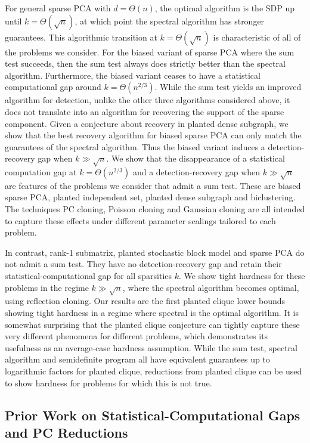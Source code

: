 \documentclass[11pt]{article}
\begin{document}
For general sparse PCA with $d = \Theta(n)$, the optimal algorithm is the SDP up until $k = \Theta(\sqrt{n})$, at which point the spectral algorithm has stronger guarantees. This algorithmic transition at $k = \Theta(\sqrt{n})$ is characteristic of all of the problems we consider. For the biased variant of sparse PCA where the sum test succeeds, then the sum test always does strictly better than the spectral algorithm. Furthermore, the biased variant ceases to have a statistical computational gap around $k = \Theta(n^{2/3})$. While the sum test yields an improved algorithm for detection, unlike the other three algorithms considered above, it does not translate into an algorithm for recovering the support of the sparse component. Given a conjecture about recovery in planted dense subgraph, we show that the best recovery algorithm for biased sparse PCA can only match the guarantees of the spectral algorithm. Thus the biased variant induces a detection-recovery gap when $k \gg \sqrt{n}$. We show that the disappearance of a statistical computation gap at $k = \Theta(n^{2/3})$ and a detection-recovery gap when $k \gg \sqrt{n}$ are features of the problems we consider that admit a sum test. These are biased sparse PCA, planted independent set, planted dense subgraph and biclustering. The techniques PC cloning, Poisson cloning and Gaussian cloning are all intended to capture these effects under different parameter scalings tailored to each problem.

In contrast, rank-1 submatrix, planted stochastic block model and sparse PCA do not admit a sum test. They have no detection-recovery gap and retain their statistical-computational gap for all sparsities $k$. We show tight hardness for these problems in the regime $k \gg \sqrt{n}$, where the spectral algorithm becomes optimal, using reflection cloning. Our results are the first planted clique lower bounds showing tight hardness in a regime where spectral is the optimal algorithm. It is somewhat surprising that the planted clique conjecture can tightly capture these very different phenomena for different problems, which demonstrates its usefulness as an average-case hardness assumption. While the sum test, spectral algorithm and semidefinite program all have equivalent guarantees up to logarithmic factors for planted clique, reductions from planted clique can be used to show hardness for problems for which this is not true.

\subsection{Prior Work on Statistical-Computational Gaps and PC Reductions}
\end{document}
